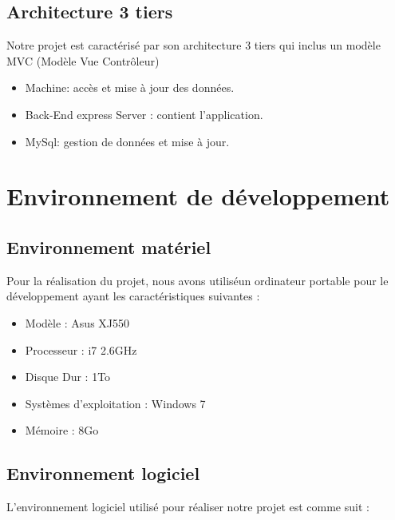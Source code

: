  \subsection{ Architecture 3 tiers}

Notre projet est caract\'{e}ris\'{e} par son architecture 3 tiers qui inclus un mod\`{e}le MVC (Mod\`{e}le
Vue Contr\^{o}leur)

\begin{itemize}
  \item { Machine: acc\`{e}s et mise \`{a} jour des donn\'{e}es.}
  \item {Back-End express Server : contient l'application.}
  \item {MySql: gestion de donn\'{e}es et mise \`{a} jour.}

\end{itemize}



\section{Environnement de d\'{e}veloppement}

  \subsection{Environnement mat\'{e}riel }

  Pour la r\'{e}alisation du projet, nous avons utilis\'{e}un ordinateur
  portable pour le d\'{e}veloppement ayant les caract\'{e}ristiques suivantes :

\begin{itemize}
  \item {  Mod\`{e}le : Asus XJ550 }
  \item {Processeur : i7 2.6GHz }
  \item {Disque Dur : 1To }
  \item { Syst\`{e}mes d'exploitation : Windows 7  }
  \item {M\'{e}moire : 8Go}

\end{itemize}





  \subsection{Environnement logiciel}


L'environnement logiciel utilis\'{e} pour r\'{e}aliser notre projet est comme suit : \newline

